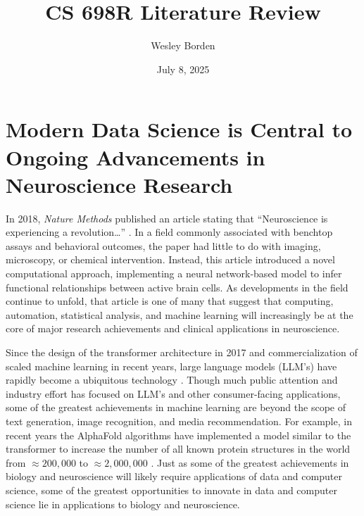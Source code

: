 \documentclass[11pt]{article}
\title{CS 698R Literature Review}
\author{Wesley Borden}
\date{July 8, 2025}
\newcommand{\sectionwithindent}[1]{
    \section*{#1}
    \hspace{\parindent} %
}
\begin{document}
\sectionwithindent{Modern Data Science is Central to Ongoing Advancements in Neuroscience Research}
In 2018, \textit{Nature Methods} published an article stating that ``Neuroscience is experiencing a revolution\dots'' \cite{Pandarinath2018autoencoders}. In a field commonly associated with benchtop assays and behavioral outcomes, the paper had little to do with imaging, microscopy, or chemical intervention. Instead, this article introduced a novel computational approach, implementing a neural network-based model to infer functional relationships between active brain cells. As developments in the field continue to unfold, that article is one of many that suggest that computing, automation, statistical analysis, and machine learning will increasingly be at the core of major research achievements and clinical applications in neuroscience.

Since the design of the transformer architecture in 2017 \cite{vaswani2023attentionneed} and commercialization of scaled machine learning in recent years, large language models (LLM's) have rapidly become a ubiquitous technology \cite{wikipedia2025llm}. Though much public attention and industry effort has focused on LLM's and other consumer-facing applications, some of the greatest achievements in machine learning are beyond the scope of text generation, image recognition, and media recommendation. For example, in recent years the AlphaFold algorithms have implemented a model similar to the transformer to increase the number of all known protein structures in the world from $\approx200,000$ to $\approx2,000,000$ \cite{Jumper2021,wikipedia2025alphafold,wikipedia2025pdb}. Just as some of the greatest achievements in biology and neuroscience will likely require applications of data and computer science, some of the greatest opportunities to innovate in data and computer science lie in applications to biology and neuroscience.
\end{document}
